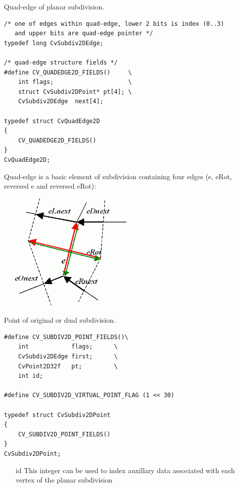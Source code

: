 \label{CvQuadEdge2D}

Quad-edge of planar subdivision.

\begin{lstlisting}
/* one of edges within quad-edge, lower 2 bits is index (0..3)
   and upper bits are quad-edge pointer */
typedef long CvSubdiv2DEdge;

/* quad-edge structure fields */
#define CV_QUADEDGE2D_FIELDS()     \
    int flags;                     \
    struct CvSubdiv2DPoint* pt[4]; \
    CvSubdiv2DEdge  next[4];

typedef struct CvQuadEdge2D
{
    CV_QUADEDGE2D_FIELDS()
}
CvQuadEdge2D;

\end{lstlisting}

Quad-edge is a basic element of subdivision containing four edges (e, eRot, reversed e and reversed eRot):

\includegraphics[width=0.5\textwidth]{pics/quadedge.png}

\label{CvSubdiv2DPoint}

Point of original or dual subdivision.

\begin{lstlisting}
#define CV_SUBDIV2D_POINT_FIELDS()\
    int            flags;      \
    CvSubdiv2DEdge first;      \
    CvPoint2D32f   pt;         \
    int id;

#define CV_SUBDIV2D_VIRTUAL_POINT_FLAG (1 << 30)

typedef struct CvSubdiv2DPoint
{
    CV_SUBDIV2D_POINT_FIELDS()
}
CvSubdiv2DPoint;
\end{lstlisting}

\begin{itemize}
\item[id] This integer can be used to index auxillary data associated with each vertex of the planar subdivision
\end{itemize}

